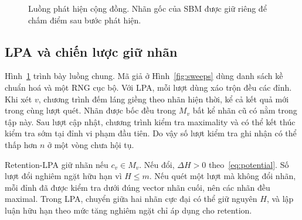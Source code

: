 \begin{figure}[t]
\centering
{}
\caption{Luồng phát hiện cộng đồng. Nhãn gốc của SBM được giữ riêng để chấm điểm sau bước phát hiện.}
\label{fig:pipeline}
\end{figure}

\subsection{LPA và chiến lược giữ nhãn}

Hình~\ref{fig:pipeline} trình bày luồng chung. Mã giả ở Hình~\ref{fig:sweeps} dùng danh sách kề chuẩn hoá và một RNG cục bộ. Với LPA, mỗi lượt dùng xáo trộn đều các đỉnh. Khi xét $v$, chương trình đếm láng giềng theo nhãn hiện thời, kể cả kết quả mới trong cùng lượt quét. Nhãn được bốc đều trong $M_v$ bất kể nhãn cũ có nằm trong tập này. Sau lượt cập nhật, chương trình kiểm tra maximality và có thể kết thúc kiểm tra sớm tại đỉnh vi phạm đầu tiên. Do vậy số lượt kiểm tra ghi nhận có thể thấp hơn $n$ ở một vòng chưa hội tụ.

Retention-LPA giữ nhãn nếu $c_v\in M_v$. Nếu đổi, $\Delta H>0$ theo~\eqref{eq:potential}. Số lượt đổi nghiêm ngặt hữu hạn vì $H\le m$. Nếu quét một lượt mà không đổi nhãn, mỗi đỉnh đã được kiểm tra dưới đúng vector nhãn cuối, nên các nhãn đều maximal. Trong LPA, chuyển giữa hai nhãn cực đại có thể giữ nguyên $H$, và lập luận hữu hạn theo mức tăng nghiêm ngặt chỉ áp dụng cho retention.

